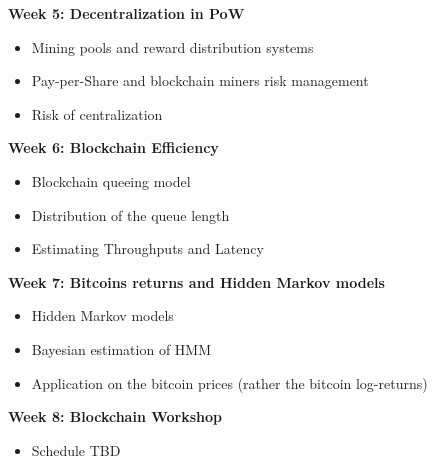 \documentclass[11pt]{article}
\begin{document}
\noindent \textbf{Week 5: Decentralization in PoW}\\
\begin{itemize}
	\item Mining pools and reward distribution systems
	\item Pay-per-Share and blockchain miners risk management
	\item Risk of centralization
\end{itemize}


\noindent \textbf{Week 6: Blockchain Efficiency}\\
\begin{itemize}
	\item Blockchain queeing model
	\item Distribution of the queue length
	\item Estimating Throughputs and Latency
\end{itemize}
\noindent \textbf{Week 7: Bitcoins returns and Hidden Markov models}\\
\begin{itemize}
	\item Hidden Markov models
	\item Bayesian estimation of HMM
	\item Application on the bitcoin prices (rather the bitcoin log-returns)
\end{itemize}
\noindent \textbf{Week 8: Blockchain Workshop}\\
\begin{itemize}
	\item Schedule TBD
\end{itemize}
\end{document}
